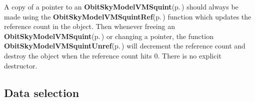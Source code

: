 A copy of a pointer to an {\bf Obit\-Sky\-Model\-VMSquint}{\rm (p.\,\pageref{structObitSkyModelVMSquint})} should always be made using the {\bf Obit\-Sky\-Model\-VMSquint\-Ref}{\rm (p.\,\pageref{ObitSkyModelVMSquint_8h_a1})} function which updates the reference count in the object. Then whenever freeing an {\bf Obit\-Sky\-Model\-VMSquint}{\rm (p.\,\pageref{structObitSkyModelVMSquint})} or changing a pointer, the function {\bf Obit\-Sky\-Model\-VMSquint\-Unref}{\rm (p.\,\pageref{ObitSkyModelVMSquint_8h_a0})} will decrement the reference count and destroy the object when the reference count hits 0. There is no explicit destructor.\subsection{Data selection}\label{ObitSkyModelVMSquint_8h_ObitSkyModelVMSquintselect}
